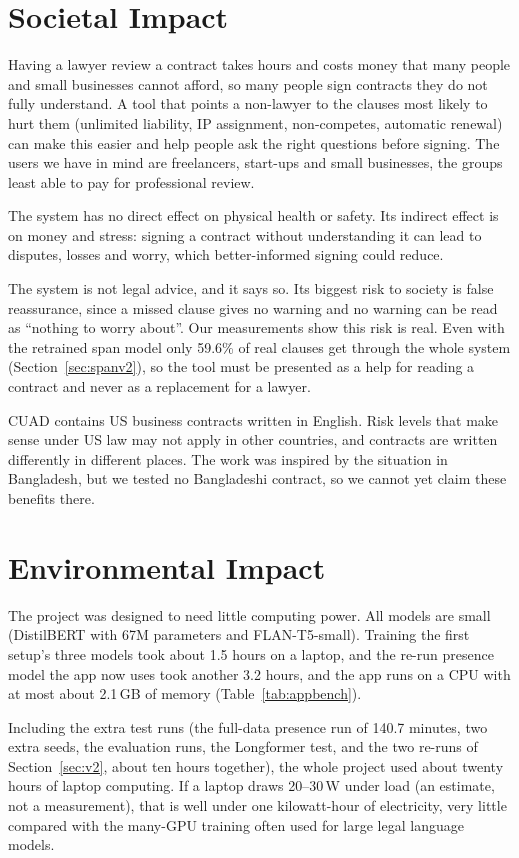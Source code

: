 \section{Societal Impact}
Having a lawyer review a contract takes hours and costs money that many people and small businesses cannot afford, so many people sign contracts they do not fully understand. A tool that points a non-lawyer to the clauses most likely to hurt them (unlimited liability, IP assignment, non-competes, automatic renewal) can make this easier and help people ask the right questions before signing. The users we have in mind are freelancers, start-ups and small businesses, the groups least able to pay for professional review.

The system has no direct effect on physical health or safety. Its indirect effect is on money and stress: signing a contract without understanding it can lead to disputes, losses and worry, which better-informed signing could reduce.

The system is not legal advice, and it says so. Its biggest risk to society is false reassurance, since a missed clause gives no warning and no warning can be read as ``nothing to worry about''. Our measurements show this risk is real. Even with the retrained span model only 59.6\% of real clauses get through the whole system (Section~\ref{sec:spanv2}), so the tool must be presented as a help for reading a contract and never as a replacement for a lawyer.

CUAD contains US business contracts written in English. Risk levels that make sense under US law may not apply in other countries, and contracts are written differently in different places. The work was inspired by the situation in Bangladesh, but we tested no Bangladeshi contract, so we cannot yet claim these benefits there.

\section{Environmental Impact}
The project was designed to need little computing power. All models are small (DistilBERT with 67M parameters and FLAN-T5-small). Training the first setup's three models took about 1.5 hours on a laptop, and the re-run presence model the app now uses took another 3.2 hours, and the app runs on a CPU with at most about 2.1\,GB of memory (Table~\ref{tab:appbench}).

Including the extra test runs (the full-data presence run of 140.7 minutes, two extra seeds, the evaluation runs, the Longformer test, and the two re-runs of Section~\ref{sec:v2}, about ten hours together), the whole project used about twenty hours of laptop computing. If a laptop draws 20--30\,W under load (an estimate, not a measurement), that is well under one kilowatt-hour of electricity, very little compared with the many-GPU training often used for large legal language models.

